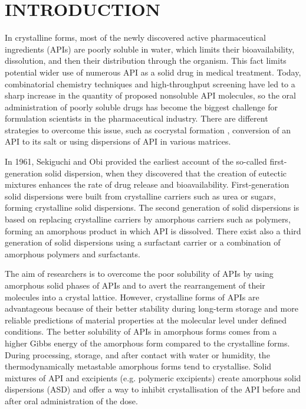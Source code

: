 \newpage
\section{INTRODUCTION}
\setcounter{page}{1}
\enlargethispage{\baselineskip}

In crystalline forms, most of the newly discovered active pharmaceutical ingredients (APIs) are poorly soluble in water, which limits their bioavailability, dissolution, and then their distribution through the organism. This fact limits potential wider use of numerous API as a solid drug in medical treatment. Today, combinatorial chemistry techniques and high-throughput screening have led to a sharp increase in the quantity of proposed nonsoluble API molecules, so the oral administration of poorly soluble drugs has become the biggest challenge for formulation scientists in the pharmaceutical industry. \cite{leuner_improving_2000} There are different strategies to overcome this issue, such as cocrystal formation \cite{batisai_solubility_2021}, conversion of an API to its salt \cite{huang_impact_2004} or using dispersions of API in various matrices. \cite{srinarong_improved_2011} 

In 1961, Sekiguchi and Obi provided the earliest account of the so-called first-generation solid dispersion, when they discovered that the creation of eutectic mixtures enhances the rate of drug release and bioavailability. First-generation solid dispersions were built from crystalline carriers such as urea or sugars, forming crystalline solid dispersions. The second generation of solid dispersions is based on replacing crystalline carriers by amorphous carriers such as polymers, forming an amorphous product in which API is dissolved. There exist also a third generation of solid dispersions using a surfactant carrier or a combination of amorphous polymers and surfactants.~\cite{vasconcelos_solid_2007}

The aim of researchers is to overcome the poor solubility of APIs by using amorphous solid phases of APIs and to avert the rearrangement of their molecules into a crystal lattice. However, crystalline forms of APIs are advantageous because of their better stability during long-term storage and more reliable predictions of material properties at the molecular level under defined conditions. \cite{caron_comparison_2011} The better solubility of APIs in amorphous forms comes from a higher Gibbs energy of the amorphous form compared to the crystalline forms. During processing, storage, and after contact with water or humidity, the thermodynamically metastable amorphous forms tend to crystallise. Solid mixtures of API and excipients (e.g. polymeric excipients) create amorphous solid dispersions (ASD) and offer a way to inhibit crystallisation of the API before and after oral administration of the dose. \cite{prudic_thermodynamic_2014}

